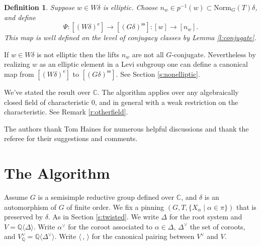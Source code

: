 \documentclass[10pt,leqno]{article}
\newtheorem{definition}[equation]{Definition}
\newcommand{\Norm}{\text{Norm}}
\newcommand{\C}{\mathbb C}
\newcommand{\Q}{\mathbb Q}
\newcommand{\ch}[1]{#1^\vee}
\renewcommand{\sec}[1]{\section{#1}
\renewcommand{\theequation}{\thesection.\arabic{equation}}
  \setcounter{equation}{0}}
\newcommand\inv{^{-1}}
\renewcommand{\ss}{\text{ss}}
\newcommand{\e}{\text{e}}
\def\d{\delta}
\renewcommand{\sec}[1]{\section{#1}
\renewcommand{\theequation}{\thesection.\arabic{equation}}
  \setcounter{equation}{0}}
\begin{document}
\begin{definition}
 \label{d:basictwisted}
Suppose $w\in W\delta$ is elliptic.
Choose $n_w\in p\inv(w)\subset \Norm_G(T)\delta$, and define
$$
\Psi: [(W\delta)^\e]\rightarrow[(G\delta)^{\ss}]: [w]\rightarrow [n_w].
$$
This map is well defined on the level of conjugacy classes by Lemma \ref{l:conjugate}.
\end{definition}

If $w\in W\delta$ is not elliptic then the lifts $n_w$ are not all $G$-conjugate. Nevertheless
by realizing $w$ as an elliptic element in a Levi subgroup one can define a canonical map
from $[(W\delta)^\e]$ to $[(G\delta)^{\ss}]$. See Section \ref{s:nonelliptic}.

We've stated the result over $\C$. The algorithm applies over any
algebraically closed field of characteristic $0$, and in general with
a weak restriction on the characteristic. See Remark
\ref{r:otherfield}.

The authors thank Tom Haines for numerous helpful discussions and thank the referee for their suggestions and comments. 

\sec{The Algorithm}
\label{const}

Assume $G$ is a semisimple reductive group defined over $\C$, and
$\delta$ is an automorphism of $G$ of finite order. We fix a pinning
$(G,T,\{X_\alpha\mid\alpha\in\pi\})$ that is preserved by $\d$. As in Section \ref{s:twisted}.  We write $\Delta$ for
the root system and $V=\Q\langle\Delta\rangle$.  Write $\ch\alpha$ for
the coroot associated to $\alpha\in\Delta$, $\ch\Delta$ the set of
coroots, and $\ch V_\Q=\Q\langle\ch\Delta\rangle$.
Write $\langle\,,\,\rangle$ for the canonical pairing between $\ch V$ and $V$.
\end{document}
